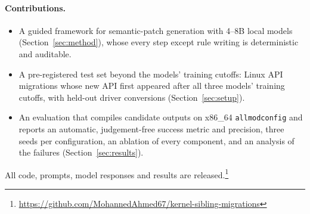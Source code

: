 \paragraph{Contributions.}
\begin{itemize}
  \item A guided framework for semantic-patch generation with 4--8B local models (Section~\ref{sec:method}), whose
    every step except rule writing is deterministic and auditable.
  \item A pre-registered test set beyond the models' training cutoffs: \testMigrations{} Linux API migrations whose new API first
    appeared after all three models' training cutoffs, with \testTargets{} held-out driver conversions
    (Section~\ref{sec:setup}).
  \item An evaluation that compiles candidate outputs on x86\_64 \texttt{allmodconfig} and reports an automatic,
    judgement-free success metric and precision, three seeds per configuration, an ablation of every component,
    and an analysis of the failures (Section~\ref{sec:results}).
\end{itemize}
All code, prompts, model responses and results are released.\footnote{\url{https://github.com/MohannedAhmed67/kernel-sibling-migrations}}
